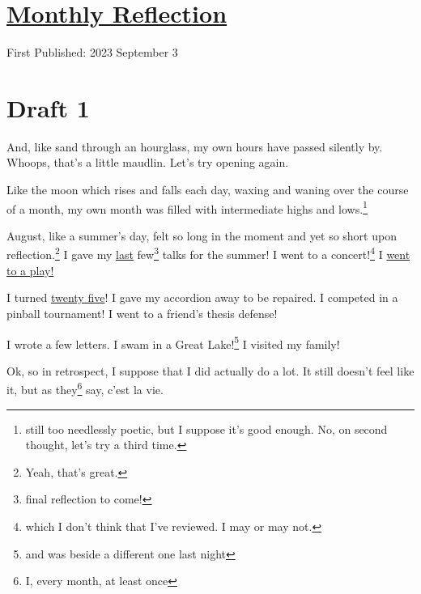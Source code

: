 \documentclass[12pt]{article}[titlepage]
\renewcommand{\,}{\textsuperscript{,}}
\begin{document}
\doublespacing
\section{\href{reflection-august-23.html}{Monthly Reflection}}
First Published: 2023 September 3

\section{Draft 1}
And, like sand through an hourglass, my own hours have passed silently by.
Whoops, that's a little maudlin.
Let's try opening again.

Like the moon which rises and falls each day, waxing and waning over the course of a month, my own month was filled with intermediate highs and lows.\footnote{still too needlessly poetic, but I suppose it's good enough.
No, on second thought, let's try a third time.}

August, like a summer's day, felt so long in the moment and yet so short upon reflection.\footnote{Yeah, that's great.}
I gave my \href{universe-4.html}{last} few\footnote{final reflection to come!} talks for the summer!
I went to a concert!\footnote{which I don't think that I've reviewed.
I may or may not.}
I \href{ms-holmes-ms-watson.hmtl}{went to a play!}

I turned \href{twenty-five}{twenty five}!
I gave my accordion away to be repaired.
I competed in a pinball tournament!
I went to a friend's thesis defense!

I wrote a few letters.
I swam in a Great Lake!\footnote{and was beside a different one last night}
I visited my family!

Ok, so in retrospect, I suppose that I did actually do a lot.
It still doesn't feel like it, but as they\footnote{I, every month, at least once} say, c'est la vie.
\end{document}
